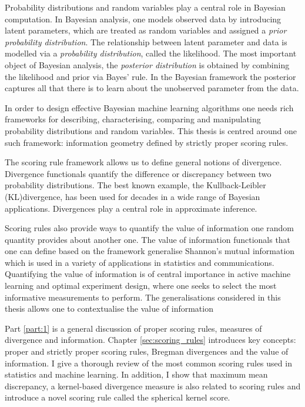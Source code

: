 
Probability distributions and random variables play a central role in Bayesian computation. In Bayesian analysis, one models observed data by introducing latent parameters, which are treated as random variables and assigned a \emph{prior probability distribution}. The relationship between latent parameter and data is modelled via a \emph{probability distribution}, called the likelihood. The most important object of Bayesian analysis, the  \emph{posterior distribution} is obtained by combining the likelihood and prior via Bayes' rule. In the Bayesian framework the posterior captures all that there is to learn about the unobserved parameter from the data.

In order to design effective Bayesian machine learning algorithms one needs rich frameworks for describing, characterising, comparing and manipulating probability distributions and random variables. This thesis is centred around one such framework: information geometry defined by strictly proper scoring rules.

The scoring rule framework allows us to define general notions of divergence. Divergence functionals quantify the difference or discrepancy between two probability distributions. The best known example, the Kullback-Leibler (KL)divergence, has been used for decades in a wide range of Bayesian applications. Divergences play a central role in approximate inference. 

Scoring rules also provide ways to quantify the value of information one random quantity provides about another one. The value of information functionals that one can define based on the framework generalise Shannon's mutual information which is used in a variety of applications in statistics and communications. Quantifying the value of information is of central importance in active machine learning and optimal experiment design, where one seeks to select the most informative measurements to perform. The generalisations considered in this thesis allows one to contextualise the value of information

Part \ref{part:1} is a general discussion of proper scoring rules, measures of divergence and information. Chapter \ref{sec:scoring_rules} introduces key concepts: proper and strictly proper scoring rules, Bregman divergences and the value of information. I give a thorough review of the most common scoring rules used in statistics and machine learning. In addition, I show that maximum mean discrepancy, a kernel-based divergence measure is also related to scoring rules and introduce a novel scoring rule called the spherical kernel score.

